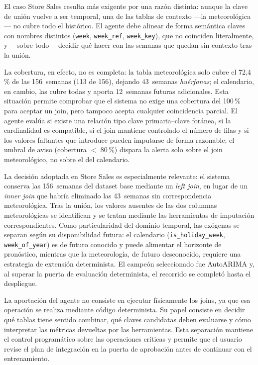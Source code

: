 \documentclass[12pt,a4paper]{article}
\theoremstyle{plain}
\begin{document}
El caso Store Sales resulta más exigente por una razón distinta: aunque la clave de unión vuelve a ser temporal, una de las tablas de contexto —la meteorológica— no cubre todo el histórico. El agente debe alinear de forma semántica claves con nombres distintos (\texttt{week}, \texttt{week\_ref}, \texttt{week\_key}), que no coinciden literalmente, y —sobre todo— decidir qué hacer con las semanas que quedan sin contexto tras la unión.

La cobertura, en efecto, no es completa: la tabla meteorológica solo cubre el 72,4\,\% de las 156~semanas (113 de 156), dejando 43~semanas \emph{huérfanas}; el calendario, en cambio, las
cubre todas y aporta 12~semanas futuras adicionales. Esta situación permite comprobar que el sistema no exige una cobertura del 100\,\% para aceptar un join, pero tampoco acepta cualquier coincidencia parcial. El agente evalúa si existe una relación tipo clave primaria--clave foránea, si la cardinalidad es compatible, si el join mantiene controlado el número de filas y si los valores faltantes que introduce pueden imputarse de
forma razonable; el umbral de aviso (cobertura $<$ 80\,\%) dispara la alerta solo sobre el join meteorológico, no sobre el del calendario.

La decisión adoptada en Store Sales es especialmente relevante: el sistema conserva las 156~semanas
del dataset base mediante un \textit{left join}, en lugar de un \textit{inner join} que habría eliminado las 43~semanas sin correspondencia meteorológica. Tras la unión, los
valores ausentes de las dos columnas meteorológicas se identifican y se tratan mediante las herramientas de imputación correspondientes. Como particularidad del dominio temporal, las
exógenas se separan según su disponibilidad futura: el calendario (\texttt{is\_holiday\_week}, \texttt{week\_of\_year}) es de futuro conocido y puede alimentar el horizonte de pronóstico, mientras que la meteorología, de futuro desconocido, requiere una estrategia de extensión determinista. El campeón seleccionado fue AutoARIMA y, al superar la puerta de evaluación
determinista, el recorrido se completó hasta el despliegue.

La aportación del agente no consiste en ejecutar físicamente los joins, ya que esa operación se realiza mediante código determinista. Su papel consiste en decidir qué tablas
tiene sentido combinar, qué claves candidatas deben evaluarse y cómo interpretar las métricas devueltas por las herramientas. Esta separación mantiene el control programático sobre las
operaciones críticas y permite que el usuario revise el plan de integración en la puerta de aprobación antes de continuar con el entrenamiento.
\end{document}
